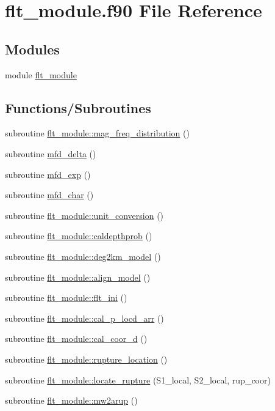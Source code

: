 \hypertarget{flt__module_8f90}{}\section{flt\+\_\+module.\+f90 File Reference}
\label{flt__module_8f90}
\subsection*{Modules}
\begin{DoxyCompactItemize}
\item 
module \hyperlink{namespaceflt__module}{flt\+\_\+module}
\end{DoxyCompactItemize}
\subsection*{Functions/\+Subroutines}
\begin{DoxyCompactItemize}
\item 
subroutine \hyperlink{namespaceflt__module_a36fbe983f26cb385897a0f3b3a69b374}{flt\+\_\+module\+::mag\+\_\+freq\+\_\+distribution} ()
\item 
subroutine \hyperlink{flt__module_8f90_a97aa7eb6fea0093dd73109fe014535b4}{mfd\+\_\+delta} ()
\item 
subroutine \hyperlink{flt__module_8f90_a57006c14043e293ddc4506dfe0291848}{mfd\+\_\+exp} ()
\item 
subroutine \hyperlink{flt__module_8f90_abcae43af287f888ab306c973bdfa32e1}{mfd\+\_\+char} ()
\item 
subroutine \hyperlink{namespaceflt__module_adf3a48955b957b3900c168b85a7e3a7f}{flt\+\_\+module\+::unit\+\_\+conversion} ()
\item 
subroutine \hyperlink{namespaceflt__module_abdb1848f76f2f97490cbb813742463bb}{flt\+\_\+module\+::caldepthprob} ()
\item 
subroutine \hyperlink{namespaceflt__module_a7c28beda425cae19654ab1d770575fa9}{flt\+\_\+module\+::deg2km\+\_\+model} ()
\item 
subroutine \hyperlink{namespaceflt__module_a5fa0cac3fd11ee99069c21930a0e2fa4}{flt\+\_\+module\+::align\+\_\+model} ()
\item 
subroutine \hyperlink{namespaceflt__module_a70e82d6c4a8cbb15e934c5b846b3f2fd}{flt\+\_\+module\+::flt\+\_\+ini} ()
\item 
subroutine \hyperlink{namespaceflt__module_aea512cba753c29d842ade7e80af288dc}{flt\+\_\+module\+::cal\+\_\+p\+\_\+locd\+\_\+arr} ()
\item 
subroutine \hyperlink{namespaceflt__module_ae0fae05513f5a50898cdd23f18cee48e}{flt\+\_\+module\+::cal\+\_\+coor\+\_\+d} ()
\item 
subroutine \hyperlink{namespaceflt__module_a5e554053b0a794d5027652daae033cbb}{flt\+\_\+module\+::rupture\+\_\+location} ()
\item 
subroutine \hyperlink{namespaceflt__module_a4df7cbbee97b24416c4834d0da1d86f5}{flt\+\_\+module\+::locate\+\_\+rupture} (S1\+\_\+local, S2\+\_\+local, rup\+\_\+coor)
\item 
subroutine \hyperlink{namespaceflt__module_a03121e683f2ec0d996e20de582b4a47c}{flt\+\_\+module\+::mw2arup} ()
\end{DoxyCompactItemize}
